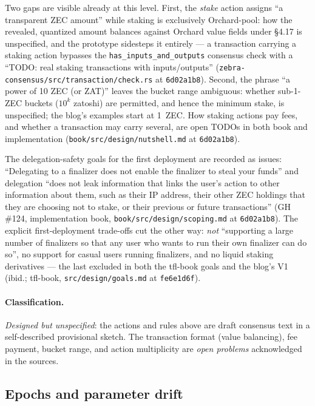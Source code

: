 \documentclass[11pt,a4paper]{article}
\theoremstyle{definition}
\begin{document}
Two gaps are visible already at this level. First, the \emph{stake}
action assigns ``a transparent ZEC amount'' while staking is exclusively
Orchard-pool: how the revealed, quantized amount balances against Orchard
value fields under \S4.17 is unspecified, and the prototype sidesteps it
entirely --- a transaction carrying a staking action bypasses the
\texttt{has\_inputs\_and\_outputs} consensus check with a ``TODO: real
staking transactions with inputs/outputs''
(\texttt{zebra-consensus/src/transaction/check.rs} at \texttt{6d02a1b8}).
Second, the phrase ``a power of 10 ZEC (or ZAT)'' leaves the bucket range
ambiguous: whether sub-1-ZEC buckets ($10^k$ zatoshi) are permitted, and
hence the minimum stake, is unspecified; the blog's examples start at
1~ZEC. How staking actions pay fees, and whether a transaction may carry
several, are open TODOs in both book and implementation
(\texttt{book/src/design/nutshell.md} at \texttt{6d02a1b8}).

The delegation-safety goals for the first deployment are recorded as
issues: ``Delegating to a finalizer does not enable the finalizer to
steal your funds'' and delegation ``does not leak information that links
the user's action to other information about them, such as their IP
address, their other ZEC holdings that they are choosing not to stake, or
their previous or future transactions'' (GH \#124, implementation book,
\texttt{book/src/design/scoping.md} at \texttt{6d02a1b8}). The explicit
first-deployment trade-offs cut the other way: \emph{not} ``supporting a
large number of finalizers so that any user who wants to run their own
finalizer can do so'', no support for casual users running finalizers,
and no liquid staking derivatives --- the last excluded in both the
tfl-book goals and the blog's V1 (ibid.; tfl-book,
\texttt{src/design/goals.md} at \texttt{fe6e1d6f}).

\paragraph{Classification.} \emph{Designed but unspecified}: the actions
and rules above are draft consensus text in a self-described provisional
sketch. The transaction format (value balancing), fee payment, bucket
range, and action multiplicity are \emph{open problems} acknowledged in
the sources.

\subsection{Epochs and parameter drift}\label{sec:xl-stake-params}
\end{document}
